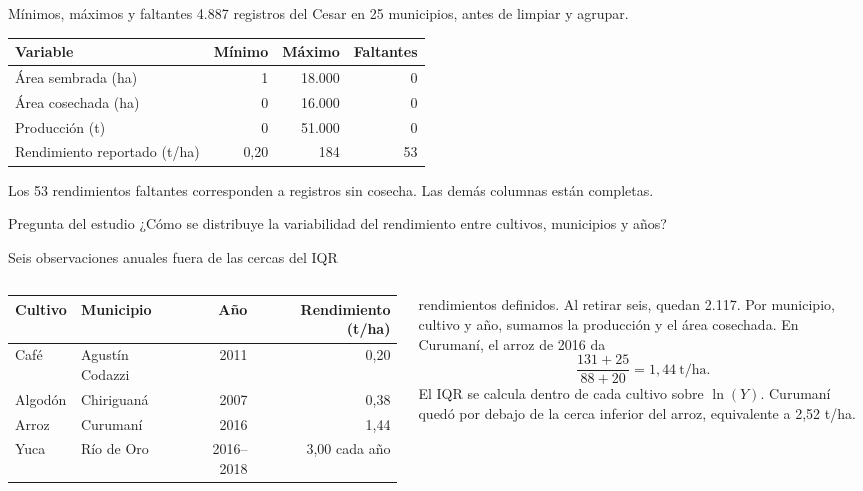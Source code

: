 \documentclass[aspectratio=169,10pt]{beamer}
\begin{document}
\begin{frame}{Mínimos, máximos y faltantes}
\small
4.887 registros del Cesar en 25 municipios, antes de limpiar y agrupar.
\vspace{.75em}

\centering
\begin{tabular}{lrrr}
\toprule
Variable & Mínimo & Máximo & Faltantes\\
\midrule
Área sembrada (ha) & 1 & 18.000 & 0\\
Área cosechada (ha) & 0 & 16.000 & 0\\
Producción (t) & 0 & 51.000 & 0\\
Rendimiento reportado (t/ha) & 0,20 & 184 & 53\\
\bottomrule
\end{tabular}

\vspace{.7em}
Los 53 rendimientos faltantes corresponden a registros sin cosecha.
Las demás columnas están completas.

\begin{block}{Pregunta del estudio}
¿Cómo se distribuye la variabilidad del rendimiento entre cultivos, municipios y años?
\end{block}
\end{frame}

\begin{frame}{Seis observaciones anuales fuera de las cercas del IQR}
\begin{columns}[c,totalwidth=\textwidth]
\centering
\scriptsize
\begin{tabular}{llrr}
\toprule
Cultivo & Municipio & Año & Rendimiento (t/ha)\\
\midrule
Café & Agustín Codazzi & 2011 & 0,20\\
Algodón & Chiriguaná & 2007 & 0,38\\
Arroz & Curumaní & 2016 & 1,44\\
Yuca & Río de Oro & 2016--2018 & 3,00 cada año\\
\bottomrule
\end{tabular}

 rendimientos definidos. Al retirar seis, quedan 2.117.
\small
Por municipio, cultivo y año, sumamos la producción y el área cosechada.
En Curumaní, el arroz de 2016 da
\[
\frac{131+25}{88+20}=1{,}44\ \text{t/ha}.
\]
El IQR se calcula dentro de cada cultivo sobre \(\ln(Y)\).
Curumaní quedó por debajo de la cerca inferior del arroz, equivalente a 2,52 t/ha.
\end{columns}
\end{frame}
\end{document}
